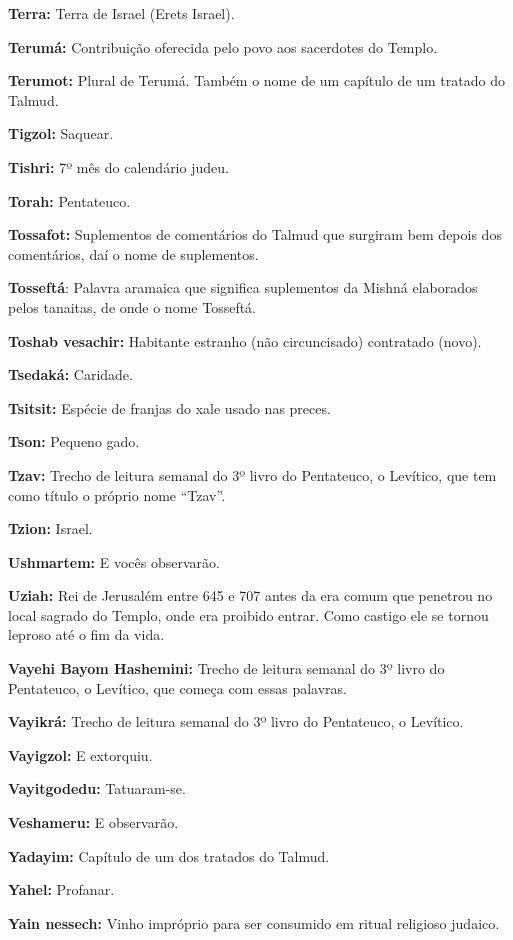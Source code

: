 \begin{hangparas}{.25in}{1}
{\textbf{Terra:} Terra de Israel (Erets Israel).

\textbf{Terumá:} Contribuição oferecida pelo povo aos sacerdotes do Templo.

\textbf{Terumot:} Plural de Terumá. Também o nome de um capítulo de um tratado do Talmud.

\textbf{Tigzol:} Saquear.

\textbf{Tishri:} 7º mês do calendário judeu.

\textbf{Torah:} Pentateuco.

\textbf{Tossafot:} Suplementos de comentários do Talmud que surgiram
bem depois dos comentários, daí o nome de suplementos.

\textbf{Tosseftá}: Palavra aramaica que significa suplementos da Mishná
elaborados pelos tanaitas, de onde o nome Tosseftá.

\textbf{Toshab vesachir:} Habitante estranho (não circuncisado) contratado (novo).

\textbf{Tsedaká:} Caridade.

\textbf{Tsitsit:} Espécie de franjas do xale usado nas preces.

\textbf{Tson:} Pequeno gado.

\textbf{Tzav:} Trecho de leitura semanal do 3º livro do Pentateuco, o
Levítico, que tem como título o próprio nome ``Tzav''.

\textbf{Tzion:} Israel.

\textbf{Ushmartem:} E vocês observarão.

\textbf{Uziah:} Rei de Jerusalém entre 645 e 707 antes da era comum que penetrou no local
sagrado do Templo, onde era proibido entrar. Como castigo ele se tornou
leproso até o fim da vida.

\textbf{Vayehi Bayom Hashemini:} Trecho de leitura semanal do 3º livro do Pentateuco, o Levítico, que começa com essas palavras.

\textbf{Vayikrá:} Trecho de leitura semanal do 3º livro do Pentateuco, o Levítico.

\textbf{Vayigzol:} E extorquiu.

\textbf{Vayitgodedu:} Tatuaram-se.

\textbf{Veshameru:} E observarão.

\textbf{Yadayim:} Capítulo de um dos tratados do Talmud.

\textbf{Yahel:} Profanar.

\textbf{Yain nessech:} Vinho impróprio para ser consumido em ritual religioso judaico.

}
\end{hangparas}
